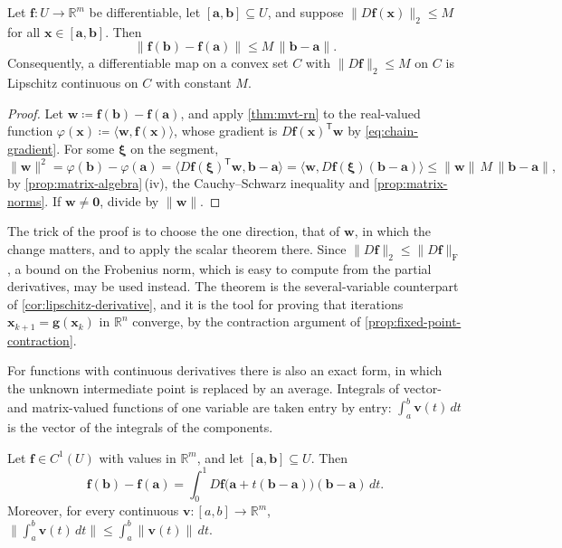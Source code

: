 \begin{theorem}
\label{thm:mean-value-inequality}
Let $\mathbf f\colon U\to\mathbb R^m$ be differentiable, let $[\mathbf a,\mathbf b]\subseteq U$, and suppose $\|D\mathbf f(\mathbf x)\|_2\le M$ for all $\mathbf x\in[\mathbf a,\mathbf b]$. Then
\[
\|\mathbf f(\mathbf b)-\mathbf f(\mathbf a)\|\le M\,\|\mathbf b-\mathbf a\| .
\]
Consequently, a differentiable map on a convex set $C$ with $\|D\mathbf f\|_2\le M$ on $C$ is Lipschitz continuous on $C$ with constant $M$.
\end{theorem}

\begin{proof}
Let $\mathbf w\coloneqq\mathbf f(\mathbf b)-\mathbf f(\mathbf a)$, and apply \cref{thm:mvt-rn} to the real-valued function $\varphi(\mathbf x)\coloneqq\langle\mathbf w,\mathbf f(\mathbf x)\rangle$, whose gradient is $D\mathbf f(\mathbf x)^{\mathsf T}\mathbf w$ by \eqref{eq:chain-gradient}. For some $\boldsymbol\xi$ on the segment,
\[
\|\mathbf w\|^2=\varphi(\mathbf b)-\varphi(\mathbf a)=\bigl\langle D\mathbf f(\boldsymbol\xi)^{\mathsf T}\mathbf w,\mathbf b-\mathbf a\bigr\rangle=\bigl\langle\mathbf w,D\mathbf f(\boldsymbol\xi)(\mathbf b-\mathbf a)\bigr\rangle\le\|\mathbf w\|\,M\,\|\mathbf b-\mathbf a\| ,
\]
by \cref{prop:matrix-algebra}\,(iv), the Cauchy--Schwarz inequality and \cref{prop:matrix-norms}. If $\mathbf w\ne\mathbf0$, divide by $\|\mathbf w\|$.
\end{proof}

The trick of the proof is to choose the one direction, that of $\mathbf w$, in which the change matters, and to apply the scalar theorem there. Since $\|D\mathbf f\|_2\le\|D\mathbf f\|_{\mathrm F}$, a bound on the Frobenius norm, which is easy to compute from the partial derivatives, may be used instead. The theorem is the several-variable counterpart of \cref{cor:lipschitz-derivative}, and it is the tool for proving that iterations $\mathbf x_{k+1}=\mathbf g(\mathbf x_k)$ in $\mathbb R^n$ converge, by the contraction argument of \cref{prop:fixed-point-contraction}.

For functions with continuous derivatives there is also an exact form, in which the unknown intermediate point is replaced by an average. Integrals of vector- and matrix-valued functions of one variable are taken entry by entry: $\int_a^b\mathbf v(t)\,dt$ is the vector of the integrals of the components.

\begin{proposition}
\label{prop:mvt-integral-rn}
Let $\mathbf f\in C^1(U)$ with values in $\mathbb R^m$, and let $[\mathbf a,\mathbf b]\subseteq U$. Then
\[
\mathbf f(\mathbf b)-\mathbf f(\mathbf a)=\int_0^1D\mathbf f\bigl(\mathbf a+t(\mathbf b-\mathbf a)\bigr)(\mathbf b-\mathbf a)\,dt .
\]
Moreover, for every continuous $\mathbf v\colon[a,b]\to\mathbb R^m$, $\bigl\|\int_a^b\mathbf v(t)\,dt\bigr\|\le\int_a^b\|\mathbf v(t)\|\,dt$.
\end{proposition}


